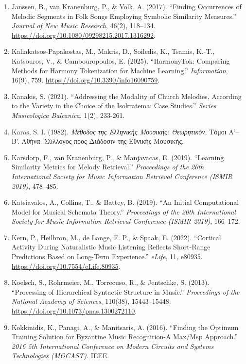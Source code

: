 \documentclass[11pt,a4paper]{article}
\begin{document}
\begin{enumerate}
Janssen, B., Burgoyne, J. A., \& Honing, H. (2017). ``Predicting Variation of Folk Songs: A Corpus Analysis Study on the Memorability of Melodies.'' \emph{Frontiers in Psychology}, 8, 621. \url{https://doi.org/10.3389/fpsyg.2017.00621}.
\item
 Janssen, B., van Kranenburg, P., \& Volk, A. (2017). ``Finding Occurrences of Melodic Segments in Folk Songs Employing Symbolic Similarity Measures.'' \emph{Journal of New Music Research}, 46(2), 118--134. \url{https://doi.org/10.1080/09298215.2017.1316292}.
\item
 Kaliakatsos-Papakostas, M., Makris, D., Soiledis, K., Tsamis, K.-T., Katsouros, V., \& Cambouropoulos, E. (2025). ``HarmonyTok: Comparing Methods for Harmony Tokenization for Machine Learning.'' \emph{Information}, 16(9), 759. \url{https://doi.org/10.3390/info16090759}.
\item
 Kanakis, S. (2021). ``Addressing the Modality of Church Melodies, According to the Variety in the Choice of the Isokratema: Case Studies.'' \emph{Series Musicologica Balcanica}, 1(2), 233-261.
\item
 Karas, S. I. (1982). \emph{Μέθοδος της Ελληνικής Μουσικής: Θεωρητικόν}, Τόμοι Α'--Β'. Αθήνα: Σύλλογος προς Διάδοσιν της Εθνικής Μουσικής.
\item
 Karsdorp, F., van Kranenburg, P., \& Manjavacas, E. (2019). ``Learning Similarity Metrics for Melody Retrieval.'' \emph{Proceedings of the 20th International Society for Music Information Retrieval Conference (ISMIR 2019)}, 478--485.
\item
 Katsiavalos, A., Collins, T., \& Battey, B. (2019). ``An Initial Computational Model for Musical Schemata Theory.'' \emph{Proceedings of the 20th International Society for Music Information Retrieval Conference (ISMIR 2019)}, 166--172.
\item
 Kern, P., Heilbron, M., de Lange, F. P., \& Spaak, E. (2022). ``Cortical Activity During Naturalistic Music Listening Reflects Short-Range Predictions Based on Long-Term Experience.'' \emph{eLife}, 11, e80935. \url{https://doi.org/10.7554/eLife.80935}.
\item
 Koelsch, S., Rohrmeier, M., Torrecuso, R., \& Jentschke, S. (2013). ``Processing of Hierarchical Syntactic Structure in Music.'' \emph{Proceedings of the National Academy of Sciences}, 110(38), 15443--15448. \url{https://doi.org/10.1073/pnas.1300272110}.
\item
 Kokkinidis, K., Panagi, A., \& Manitsaris, A. (2016). ``Finding the Optimum Training Solution for Byzantine Music Recognition-A Max/Msp Approach.'' \emph{2016 5th International Conference on Modern Circuits and Systems Technologies (MOCAST)}. IEEE.

\end{enumerate}
\end{document}
